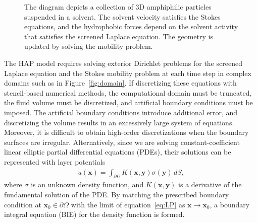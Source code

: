\label{subsec:specific_aim_2}
\begin{figure}
    \vspace{-20pt}
    \caption{\label{fig:flow_map} \footnotesize The diagram depicts a collection of 3D
    amphiphilic particles suspended in a solvent. The solvent velocity satisfies
    the Stokes equations, and the hydrophobic forces depend on the
    solvent activity that satisfies the screened Laplace equation. The
    geometry is updated by solving the mobility problem.} 
\end{figure}
The HAP model requires solving exterior Dirichlet problems for the
screened Laplace equation and the Stokes mobility problem at each time
step in complex domains such as in Figure~\ref{fig:domain}. If
discretizing these equations with stencil-based numerical methods, the
computational domain must be truncated, the fluid volume must be
discretized, and artificial boundary conditions must be imposed. The
artificial boundary conditions introduce additional error, and
discretizing the volume results in an excessively large system of
equations. Moreover, it is difficult to obtain high-order
discretizations when the boundary surfaces are irregular. Alternatively,
since we are solving constant-coefficient linear elliptic
partial differential equations (PDEs), their
solutions can be represented with layer potentials
\begin{align}
  \label{eq:LP}
  u(\mathbf{x}) = \int_{\partial\Omega} K(\mathbf{x},\mathbf{y})
  \sigma(\mathbf{y})\,dS,
\end{align}
where $\sigma$ is an unknown density function, and
$K(\mathbf{x},\mathbf{y})$ is a derivative of the fundamental solution
of the PDE. By matching the prescribed boundary condition at
$\mathbf{x}_0 \in \partial\Omega$ with the limit of
equation~\eqref{eq:LP} as $\mathbf{x}\rightarrow \mathbf{x}_0$, a
boundary integral equation (BIE) for the density function is formed. 

